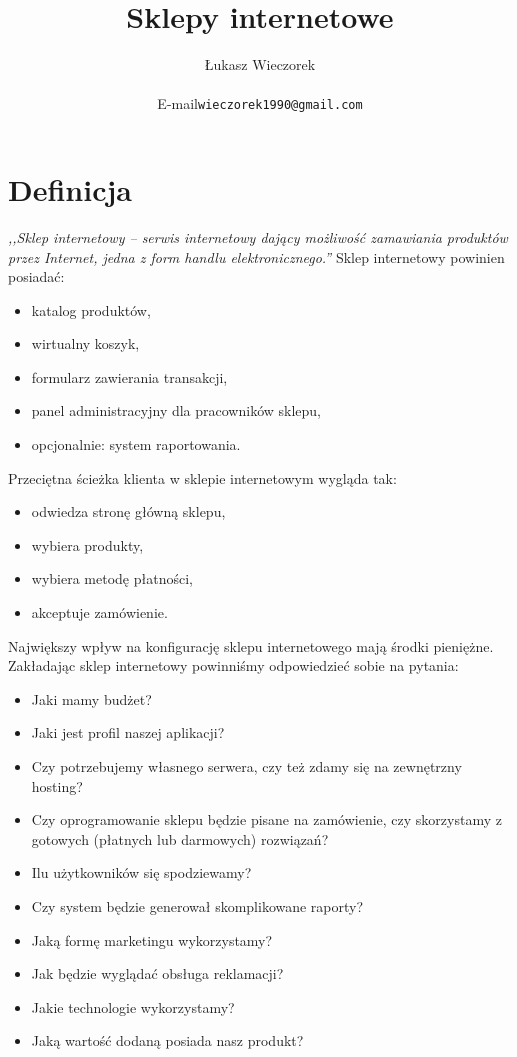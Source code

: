 \documentclass{report}
\title{
	Sklepy internetowe
}
\author{
	Łukasz Wieczorek\\
	\begin{tabular}{rl}
	E-mail & \texttt{wieczorek1990@gmail.com}\\
	\end{tabular}
}
\begin{document}
\maketitle
\section{Definicja}
\emph{,,Sklep internetowy -- serwis internetowy dający możliwość zamawiania produktów przez Internet, jedna z form handlu elektronicznego.''}\cite{wiki:sklep}
Sklep internetowy powinien posiadać:
\begin{itemize}
\item katalog produktów,
\item wirtualny koszyk,
\item formularz zawierania transakcji,
\item panel administracyjny dla pracowników sklepu,
\item opcjonalnie: system raportowania.
\end{itemize}
Przeciętna ścieżka klienta w sklepie internetowym wygląda tak:
\begin{itemize}
\item odwiedza stronę główną sklepu,
\item wybiera produkty,
\item wybiera metodę płatności,
\item akceptuje zamówienie.
\end{itemize}
Największy wpływ na konfigurację sklepu internetowego mają środki pieniężne. Zakładając sklep internetowy powinniśmy odpowiedzieć sobie na pytania:
\begin{itemize}
\item Jaki mamy budżet?
\item Jaki jest profil naszej aplikacji?
\item Czy potrzebujemy własnego serwera, czy też zdamy się na zewnętrzny hosting?
\item Czy oprogramowanie sklepu będzie pisane na zamówienie, czy skorzystamy z gotowych (płatnych lub darmowych) rozwiązań?
\item Ilu użytkowników się spodziewamy?
\item Czy system będzie generował skomplikowane raporty?
\item Jaką formę marketingu wykorzystamy?
\item Jak będzie wyglądać obsługa reklamacji?
\item Jakie technologie wykorzystamy?
\item Jaką wartość dodaną posiada nasz produkt?
\end{itemize}
\end{document}
